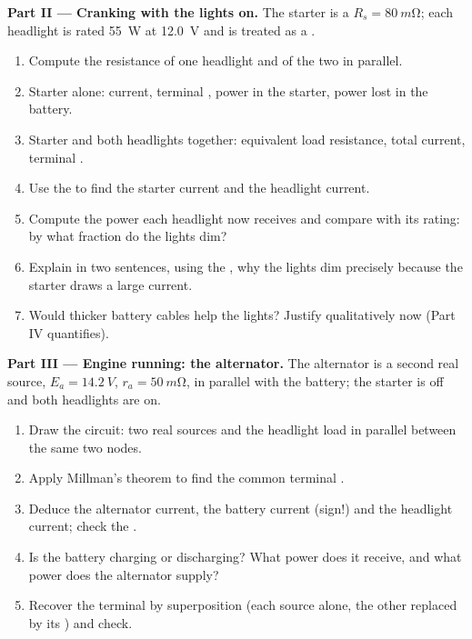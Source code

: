 \begin{problem}
\medskip
\noindent\textbf{Part II --- Cranking with the lights on.}
The starter is a  $R_s = \qty{80}{m\ohm}$; each headlight is
rated \qty{55}{W} at \qty{12.0}{V} and is treated as a .
\begin{enumerate}[resume]
  \item Compute the resistance of one headlight and of the two in
        parallel.
  \item Starter alone: current, terminal , power in the starter,
        power lost in the battery.
  \item Starter and both headlights together: equivalent load
        resistance, total current, terminal .
  \item Use the  to find the starter current and the
        headlight current.
  \item Compute the power each headlight now receives and compare with
        its rating: by what fraction do the lights dim?
  \item Explain in two sentences, using the , why the lights
        dim precisely because the starter draws a large current.
  \item Would thicker battery cables help the lights? Justify
        qualitatively now (Part IV quantifies).
\end{enumerate}

\medskip
\noindent\textbf{Part III --- Engine running: the alternator.}
The alternator is a second real source, $E_a = \qty{14.2}{V}$,
$r_a = \qty{50}{m\ohm}$, in parallel with the battery; the starter is
off and both headlights are on.
\begin{enumerate}[resume]
  \item Draw the circuit: two real sources and the headlight load in
        parallel between the same two nodes.
  \item Apply Millman's theorem to find the common terminal .
  \item Deduce the alternator current, the battery current (sign!) and
        the headlight current; check the .
  \item Is the battery charging or discharging? What power does it
        receive, and what power does the alternator supply?
  \item Recover the terminal  by superposition (each source
        alone, the other replaced by its ) and
        check.
\end{enumerate}


\end{problem}
